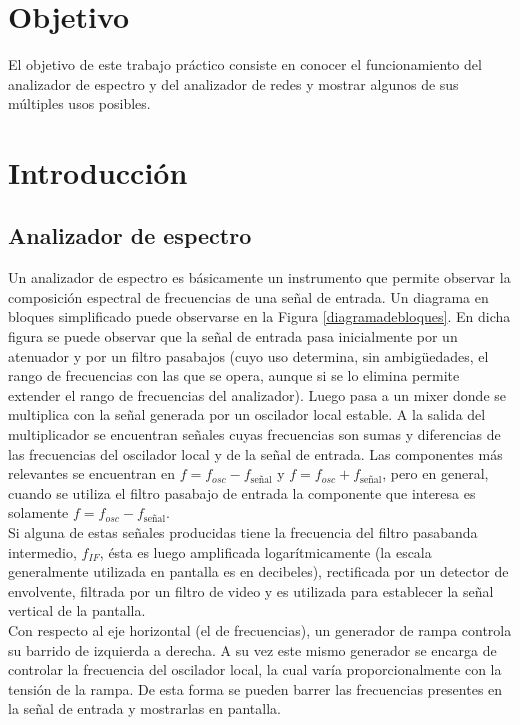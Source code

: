 \documentclass[a4paper,10pt]{article}
\title{  }
\begin{document}
	\maketitle %
	\newpage

	\tableofcontents %
	\newpage


	\section{Objetivo}
	
	\indent	El objetivo de este trabajo pr\'actico consiste en conocer el 
	funcionamiento del analizador de espectro y del analizador de redes y 
	mostrar algunos de sus m\'ultiples usos posibles.
	
	\newpage
\section{Introducci\'on}
	\subsection{Analizador de espectro}
	\indent Un analizador de espectro es b\'asicamente un instrumento que 
	permite observar la composici\'on espectral de frecuencias de una se\~nal de
	entrada. Un diagrama en bloques simplificado puede observarse en la Figura 
	\ref{diagramadebloques}. En dicha figura se puede observar que la se\~nal de
	entrada pasa inicialmente por un atenuador y por un filtro pasabajos (cuyo 
	uso determina, sin ambig\"uedades, el rango de frecuencias con las que se 
	opera, aunque si se lo elimina permite extender el rango de frecuencias del 
	analizador). Luego pasa a un mixer donde se multiplica con la 
	se\~nal generada por un oscilador local estable. A la salida del 
	multiplicador se encuentran se\~nales cuyas frecuencias son sumas y 
	diferencias de las frecuencias del oscilador local y de la se\~nal de 
	entrada. Las componentes m\'as relevantes se encuentran en 
	$f=f_{osc}-f_{\text{se\~nal}}$ y $f=f_{osc}+f_{\text{se\~nal}}$, pero en 
	general, cuando se utiliza el filtro pasabajo de entrada la componente que 
	interesa es solamente $f=f_{osc}-f_{\text{se\~nal}}$. \\
	\indent Si alguna de estas se\~nales producidas tiene la frecuencia del 
	filtro pasabanda intermedio, $f_{IF}$, \'esta es luego amplificada 
	logar\'itmicamente (la escala generalmente utilizada en pantalla es en 
	decibeles), rectificada por un detector de envolvente, filtrada por un 
	filtro de video y es utilizada para establecer la se\~nal vertical de la 
	pantalla. \\
	\indent Con respecto al eje horizontal (el de frecuencias), un generador de 
	rampa controla su barrido de izquierda a derecha. A su vez este mismo 
	generador se encarga de controlar la frecuencia del oscilador local, la 
	cual var\'ia proporcionalmente con la tensi\'on de la rampa. De esta forma 
	se pueden barrer las frecuencias presentes en la se\~nal de entrada y 
	mostrarlas en pantalla.
	
\end{document}
